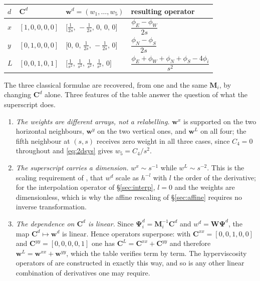 \documentclass[11pt,a4paper]{article}
\begin{document}
\begin{center}
\begin{tabular}{@{}llll@{}}
\toprule
$d$ & $\bm C^{d}$ & $\bm w^{d}=(w_1,\dots,w_5)$ & resulting operator \\
\midrule
$x$ & $[1,0,0,0,0]$ & $\bigl[\tfrac{1}{2s},\,-\tfrac{1}{2s},\,0,\,0,\,0\bigr]$
& $\dfrac{\phi_E-\phi_W}{2s}$ \\[0.5em]
$y$ & $[0,1,0,0,0]$ & $\bigl[0,\,0,\,\tfrac{1}{2s},\,-\tfrac{1}{2s},\,0\bigr]$
& $\dfrac{\phi_N-\phi_S}{2s}$ \\[0.5em]
$L$ & $[0,0,1,0,1]$ & $\bigl[\tfrac{1}{s^{2}},\,\tfrac{1}{s^{2}},\,\tfrac{1}{s^{2}},
\,\tfrac{1}{s^{2}},\,0\bigr]$
& $\dfrac{\phi_E+\phi_W+\phi_N+\phi_S-4\phi_i}{s^{2}}$ \\
\bottomrule
\end{tabular}
\end{center}

\noindent The three classical formulae are recovered, from one and the same $\bm M_i$,
by changing $\bm C^{d}$ alone. Three features of the table answer the question of what
the superscript does.

\begin{enumerate}[label=(\roman*)]
\item \emph{The weights are different arrays, not a relabelling.} $\bm w^{x}$ is
supported on the two horizontal neighbours, $\bm w^{y}$ on the two vertical ones, and
$\bm w^{L}$ on all four; the fifth neighbour at $(s,s)$ receives zero weight in all
three cases, since $C_4=0$ throughout and \eqref{eq:2dsys} gives $w_5=C_4/s^{2}$.
\item \emph{The superscript carries a dimension.} $w^{x}\sim s^{-1}$ while
$w^{L}\sim s^{-2}$. This is the scaling requirement of \cite[\S 2]{KLN2020}, that
$w^{d}$ scale as $h^{-l}$ with $l$ the order of the derivative; for the interpolation
operator of \S\ref{sec:interp}, $l=0$ and the weights are dimensionless, which is why
the affine rescaling of \S\ref{sec:affine} requires no inverse transformation.
\item \emph{The dependence on $\bm C^{d}$ is linear.} Since
$\bm\Psi^{d}_i=\bm M_i^{-1}\bm C^{d}$ and $w^{d}=\bm W\bm\Psi^{d}$, the map
$\bm C^{d}\mapsto\bm w^{d}$ is linear. Hence operators superpose: with
$\bm C^{xx}=[0,0,1,0,0]$ and $\bm C^{yy}=[0,0,0,0,1]$ one has
$\bm C^{L}=\bm C^{xx}+\bm C^{yy}$ and therefore
$\bm w^{L}=\bm w^{xx}+\bm w^{yy}$, which the table verifies term by term. The
hyperviscosity operators of \cite[Eq.~(25)]{KLN2020} are constructed in exactly this
way, and so is any other linear combination of derivatives one may require.
\end{enumerate}
\end{document}
